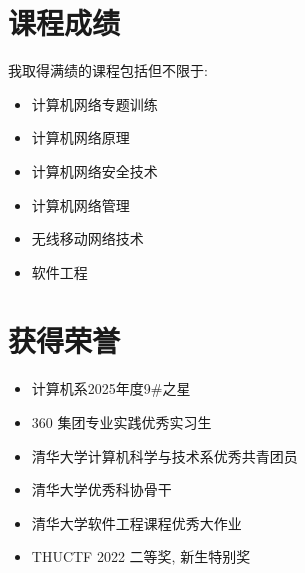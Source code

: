 \documentclass[a4paper, 10pt]{article}
\begin{document}
\noindent
\begin{minipage}[t]{0.48\textwidth}
\section*{课程成绩}
\noindent 我取得满绩的课程包括但不限于:
\begin{itemize}[left=10pt]
    \setlength{\itemsep}{0pt}
    \item 计算机网络专题训练
    \item 计算机网络原理
    \item 计算机网络安全技术
    \item 计算机网络管理
    \item 无线移动网络技术
    \item 软件工程
\end{itemize}
\end{minipage}
\hfill
\begin{minipage}[t]{0.48\textwidth}
\section*{获得荣誉}
\begin{itemize}[left=0pt]
    \setlength{\itemsep}{0pt}
    \item 计算机系2025年度9\#之星
    \item 360 集团专业实践优秀实习生
    \item 清华大学计算机科学与技术系优秀共青团员
    \item 清华大学优秀科协骨干
    \item 清华大学软件工程课程优秀大作业
    \item THUCTF 2022 二等奖, 新生特别奖
\end{itemize}
\end{minipage}

\vspace{1em}
\end{document}

